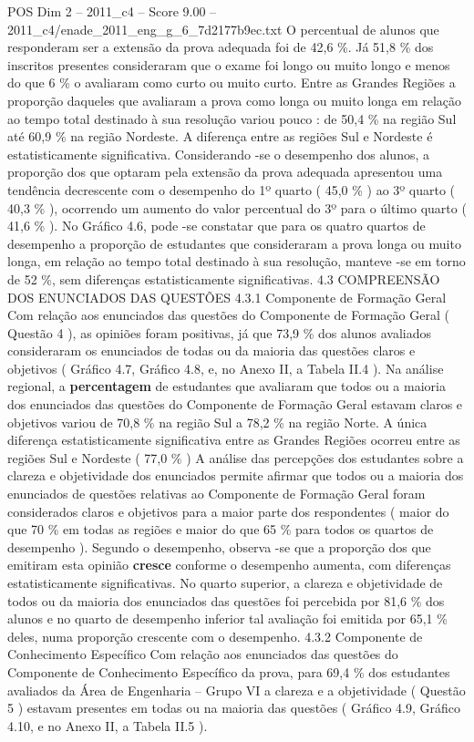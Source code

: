 \begin{textsample}{POS Dim 2 – 2011\_c4 – Score 9.00 – 2011\_c4/enade\_2011\_eng\_g\_6\_7d2177b9ec.txt}
O percentual de alunos que responderam ser a extensão da prova adequada foi de 42,6 \%.
Já 51,8 \% dos inscritos presentes consideraram que o exame foi longo ou muito longo e menos do que 6 \% o avaliaram como curto ou muito curto.
Entre as Grandes Regiões a proporção daqueles que avaliaram a prova como longa ou muito longa em relação ao tempo total destinado à sua resolução variou pouco : de 50,4 \% na região Sul até 60,9 \% na região Nordeste.
A diferença entre as regiões Sul e Nordeste é estatisticamente significativa.
Considerando -se o desempenho dos alunos, a proporção dos que optaram pela extensão da prova adequada apresentou uma tendência decrescente com o desempenho do 1º quarto ( 45,0 \% ) ao 3º quarto ( 40,3 \% ), ocorrendo um aumento do valor percentual do 3º para o último quarto ( 41,6 \% ).
No Gráfico 4.6, pode -se constatar que para os quatro quartos de desempenho a proporção de estudantes que consideraram a prova longa ou muito longa, em relação ao tempo total destinado à sua resolução, manteve -se em torno de 52 \%, sem diferenças estatisticamente significativas. 4.3 COMPREENSÃO DOS ENUNCIADOS DAS QUESTÕES 4.3.1 Componente de Formação Geral Com relação aos enunciados das questões do Componente de Formação Geral ( Questão 4 ), as opiniões foram positivas, já que 73,9 \% dos alunos avaliados consideraram os enunciados de todas ou da maioria das questões claros e objetivos ( Gráfico 4.7, Gráfico 4.8, e, no Anexo II, a Tabela II.4 ).
Na análise regional, a \textbf{percentagem} de estudantes que avaliaram que todos ou a maioria dos enunciados das questões do Componente de Formação Geral estavam claros e objetivos variou de 70,8 \% na região Sul a 78,2 \% na região Norte.
A única diferença estatisticamente significativa entre as Grandes Regiões ocorreu entre as regiões Sul e Nordeste ( 77,0 \% ) A análise das percepções dos estudantes sobre a clareza e objetividade dos enunciados permite afirmar que todos ou a maioria dos enunciados de questões relativas ao Componente de Formação Geral foram considerados claros e objetivos para a maior parte dos respondentes ( maior do que 70 \% em todas as regiões e maior do que 65 \% para todos os quartos de desempenho ).
Segundo o desempenho, observa -se que a proporção dos que emitiram esta opinião \textbf{cresce} conforme o desempenho aumenta, com diferenças estatisticamente significativas.
No quarto superior, a clareza e objetividade de todos ou da maioria dos enunciados das questões foi percebida por 81,6 \% dos alunos e no quarto de desempenho inferior tal avaliação foi emitida por 65,1 \% deles, numa proporção crescente com o desempenho. 4.3.2 Componente de Conhecimento Específico Com relação aos enunciados das questões do Componente de Conhecimento Específico da prova, para 69,4 \% dos estudantes avaliados da Área de Engenharia – Grupo VI a clareza e a objetividade ( Questão 5 ) estavam presentes em todas ou na maioria das questões ( Gráfico 4.9, Gráfico 4.10, e no Anexo II, a Tabela II.5 ).

\end{textsample}

